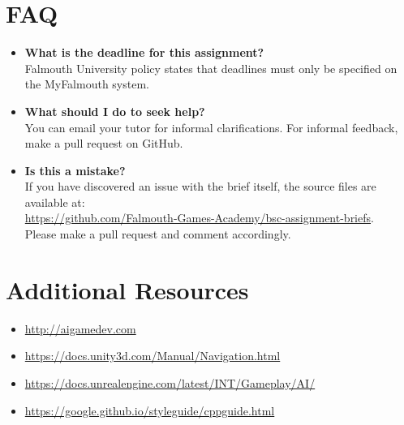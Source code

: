 \documentclass{../../fal_assignment}
\begin{document}
\section*{FAQ}

\begin{itemize}
	\item 	\textbf{What is the deadline for this assignment?} \\ 
    		Falmouth University policy states that deadlines must only be specified on the MyFalmouth system.
    		
	\item 	\textbf{What should I do to seek help?} \\ 
    		You can email your tutor for informal clarifications. For informal feedback, make a pull request on GitHub. 
    		
    	\item 	\textbf{Is this a mistake?} \\ 	
    		If you have discovered an issue with the brief itself, the source files are available at: \\
    		\url{https://github.com/Falmouth-Games-Academy/bsc-assignment-briefs}.\\
    		 Please make a pull request and comment accordingly.
\end{itemize}

\section*{Additional Resources}

\begin{itemize}
	\item \url{http://aigamedev.com}
    \item \url{https://docs.unity3d.com/Manual/Navigation.html}
    \item \url{https://docs.unrealengine.com/latest/INT/Gameplay/AI/}
    \item \url{https://google.github.io/styleguide/cppguide.html}
\end{itemize}
\end{document}
